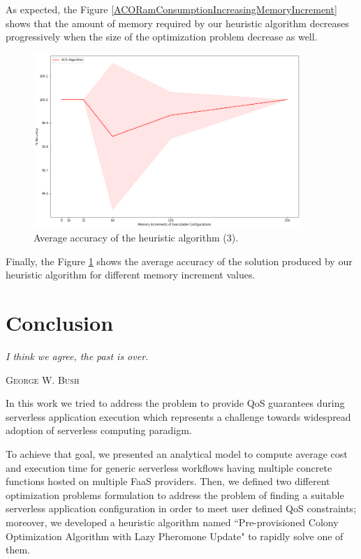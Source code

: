 \documentclass[12pt,a4paper]{report}
\newcommand{\QuoteIntro}{``}
\begin{document}
As expected, the Figure \ref{ACORamConsumptionIncreasingMemoryIncrement} shows that the amount of memory required by our heuristic algorithm decreases progressively when the size of the optimization problem decrease as well.

\begin{figure}[h]
	\centering
	\includegraphics[width=0.9\textwidth]{./Images/ACOvsOptimalAccuracyIncreasingMemoryIncrement.png}
	\caption{Average accuracy of the heuristic algorithm (3).}%
	\label{ACOvsOptimalAccuracyIncreasingMemoryIncrement}
\end{figure}

Finally, the Figure \ref{ACOvsOptimalAccuracyIncreasingMemoryIncrement} shows the average accuracy of the solution produced by our heuristic algorithm for different memory increment values.

\chapter{Conclusion}\label{chapterConclusion}
\epigraph{\itshape I think we agree, the past is over.}{\textsc{George W. Bush}}

In this work we tried to address the problem to provide QoS guarantees during serverless application execution which represents a challenge towards widespread adoption of serverless computing paradigm.

To achieve that goal, we presented an analytical model to compute average cost and execution time for generic serverless workflows having multiple concrete functions hosted on multiple FaaS providers. Then, we defined two different optimization problems formulation to address the problem of finding a suitable serverless application configuration in order to meet user defined QoS constraints; moreover, we developed a heuristic algorithm named \QuoteIntro Pre-provisioned Colony Optimization Algorithm with Lazy Pheromone Update" to rapidly solve one of them. 
\end{document}
